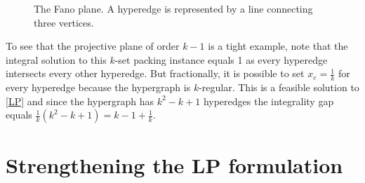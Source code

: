 \begin{figure}
\centering
{}
\caption{The Fano plane. A hyperedge is represented by a line connecting three vertices.}
\label{fig:FanoPlane}
\end{figure}


To see that the projective plane of order $k-1$ is a tight example, note that the integral solution to this $k$-set packing instance equals 1 as every hyperedge intersects every other hyperedge. But fractionally, it is possible to set $x_e = \frac{1}{k}$ for every hyperedge because the hypergraph is $k$-regular. This is a feasible solution to \eqref{LP} and since the hypergraph has $k^2-k+1$ hyperedges the integrality gap equals $\frac{1}{k}(k^2-k+1) = k - 1 + \frac{1}{k}$.

\section{Strengthening the LP formulation}\label{sec:IntersectingLP}

